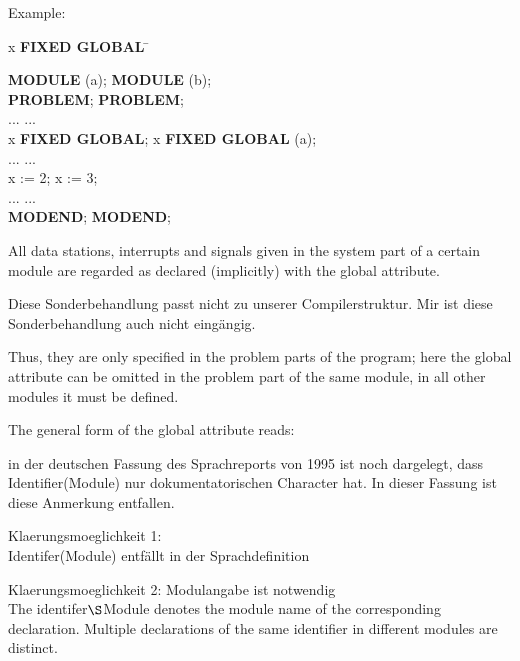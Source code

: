 Example:

\begin{tabbing}
 x {\bf FIXED GLOBAL} \hspace{2cm} \= \kill

{\bf MODULE} (a);                  \> {\bf MODULE} (b); \\
{\bf PROBLEM};                     \> {\bf PROBLEM};\\
\x ...                             \> \x ...\\
 x {\bf FIXED GLOBAL}; \>  x {\bf FIXED GLOBAL} (a);\\
\x ...                             \> \x ...\\
\x x := 2;                         \> \x x := 3;\\
\x ...                             \> \x ...\\
{\bf MODEND};                      \> {\bf MODEND};
\end{tabbing}

All data stations, interrupts and signals given in the system part of a
certain module are regarded as declared (implicitly) with the global
attribute.
\begin{discuss}
Diese Sonderbehandlung passt nicht zu unserer Compilerstruktur.
Mir ist diese Sonderbehandlung auch nicht eingängig.

\begin{removed}
Thus, they are only specified in the problem parts of the
program; here the global attribute can be omitted in the problem part of
the same module, in all other modules it must be defined.
\end{removed}
\end{discuss}

The general form of the global attribute reads:


\begin{discuss}
in der deutschen Fassung des Sprachreports von 1995 ist noch dargelegt,
dass Identifier(Module) nur dokumentatorischen Character hat.
In dieser Fassung ist diese Anmerkung entfallen.

Klaerungsmoeglichkeit 1:\\
Identifer(Module) entfällt in der Sprachdefinition

Klaerungsmoeglichkeit 2: Modulangabe ist notwendig\\
The identifer$\S $Module denotes the module name of the corresponding
declaration. Multiple declarations of the same identifier in different modules
are distinct.  
\end{discuss}

